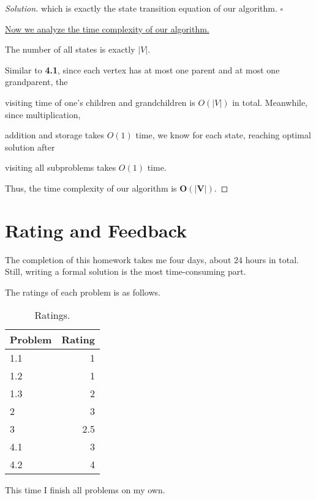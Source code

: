 \documentclass{article}
\newcommand{\whiteqed}{\hfill $\square$\par}
\newenvironment{solution}{\begin{proof}[\noindent\it Solution]}{\end{proof}}
\begin{document}
\begin{solution}
    \hspace{2.6em}
    which is exactly the state transition equation of our algorithm. \whiteqed
    
    \vspace{3em} \hspace{2.6em}
    \underline{Now we analyze the time complexity of our algorithm.}
    
    \hspace{2.6em}
    The number of all states is exactly $|V|$.
    
    \hspace{2.6em}
    Similar to \textbf{4.1}, since each vertex has at most one parent and at most one grandparent, the
    
    visiting time of one's children and grandchildren is $O(|V|)$ in total. Meanwhile, since multiplication, 
    
    addition and storage takes $O(1)$ time, we know for each state, reaching optimal solution after
    
    visiting all subproblems takes $O(1)$ time.
    
    \hspace{2.6em}
    Thus, the time complexity of our algorithm is \underline{$\boldsymbol{O(|V|)}.$}
\end{solution}


\vspace{3em}
\section{Rating and Feedback}
\vspace{1em} \hspace{1.2em}
The completion of this homework takes me four days, about $24$ hours in total. Still, writing a formal solution is the most time-consuming part.

The ratings of each problem is as follows.

\begin{table}[htbp]
    \centering
    \begin{tabular}{lr}
        \hline
        Problem & Rating \\
        \hline 
        1.1 & 1 \\
        1.2 & 1 \\
        1.3 & 2 \\
        \hline
        2 & 3 \\
        \hline
        3 & 2.5 \\
        \hline
        4.1 & 3 \\
        4.2 & 4 \\
        \hline
\end{tabular}
\caption{Ratings.}
\end{table}

This time I finish all problems on my own.
\end{document}
